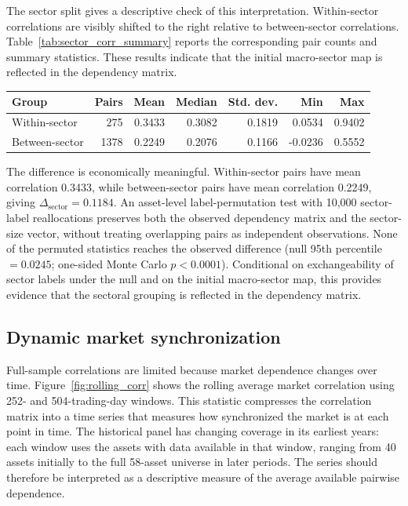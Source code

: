 The sector split gives a descriptive check of this interpretation. Within-sector correlations are visibly shifted to the right relative to between-sector correlations. Table~\ref{tab:sector_corr_summary} reports the corresponding pair counts and summary statistics. These results indicate that the initial macro-sector map is reflected in the dependency matrix.

\begin{center}
\label{tab:sector_corr_summary}
\begin{tabular}{lrrrrrr}
\toprule
Group & Pairs & Mean & Median & Std. dev. & Min & Max \\
\midrule
Within-sector & 275 & 0.3433 & 0.3082 & 0.1819 & 0.0534 & 0.9402 \\
Between-sector & 1378 & 0.2249 & 0.2076 & 0.1166 & -0.0236 & 0.5552 \\
\bottomrule
\end{tabular}
\end{center}
\GlobalPrecisionNote

The difference is economically meaningful. Within-sector pairs have mean correlation 0.3433, while between-sector pairs have mean correlation 0.2249, giving $\Delta_{\mathrm{sector}}=0.1184$. An asset-level label-permutation test with 10,000 sector-label reallocations preserves both the observed dependency matrix and the sector-size vector, without treating overlapping pairs as independent observations. None of the permuted statistics reaches the observed difference (null 95th percentile $=0.0245$; one-sided Monte Carlo $p<0.0001$). Conditional on exchangeability of sector labels under the null and on the initial macro-sector map, this provides evidence that the sectoral grouping is reflected in the dependency matrix.

\subsection{Dynamic market synchronization}

Full-sample correlations are limited because market dependence changes over time. Figure~\ref{fig:rolling_corr} shows the rolling average market correlation using 252- and 504-trading-day windows. This statistic compresses the correlation matrix into a time series that measures how synchronized the market is at each point in time. The historical panel has changing coverage in its earliest years: each window uses the assets with data available in that window, ranging from 40 assets initially to the full 58-asset universe in later periods. The series should therefore be interpreted as a descriptive measure of the average available pairwise dependence.


